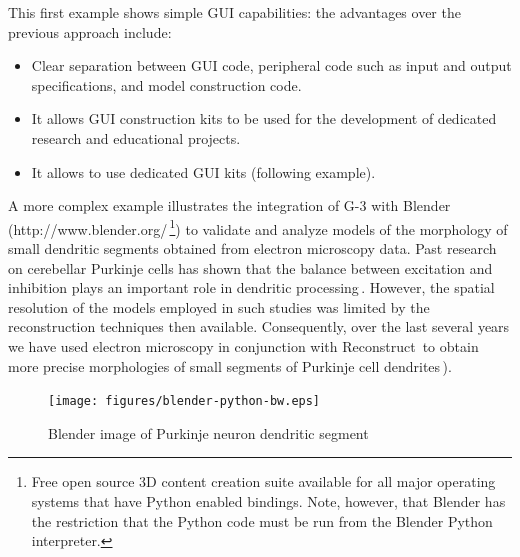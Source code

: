 \documentclass[12pt]{article}
\begin{document}

This first example shows simple GUI capabilities: the advantages over
the previous approach include:
\begin{itemize}
\item Clear separation between GUI code, peripheral
  code such as input and output specifications, and model
  construction code.
\item It allows GUI construction kits to be used for the development
  of dedicated research and educational projects.
\item It allows to use dedicated GUI kits (following example).
\end{itemize}

A more complex example illustrates the integration of G-3 with Blender
(http://www.blender.org/\,\footnote{Free open source 3D content creation suite
available for all major
operating systems that have Python enabled bindings. Note, however, that Blender
  has the restriction that the Python code must be run from the
  Blender Python interpreter.}) to validate and analyze models of the
morphology of small dendritic segments obtained from electron
microscopy data. Past research on cerebellar Purkinje cells has shown
that the balance between excitation and inhibition plays an important
role in dendritic processing\,\cite{santamaria02:_modul_purkin,
  mittmann07:_linkin_purkin}.  However, the spatial resolution of the
models employed in such studies was limited by the reconstruction
techniques then available.  Consequently, over the last several years
we have used electron microscopy in conjunction with
Reconstruct\,\cite{jc05:_recon}
to obtain more precise morphologies of small segments of Purkinje cell
dendrites\,\cite{lu09:_d_purkin, cornelis08:_model_neuros_genes}).

\begin{figure}[ht]
  \centering
    \texttt{[image: figures/blender-python-bw.eps]}
  \caption{Blender image of Purkinje neuron dendritic segment}
  \label{fig:cbi-blender}
\end{figure}

\end{document}
